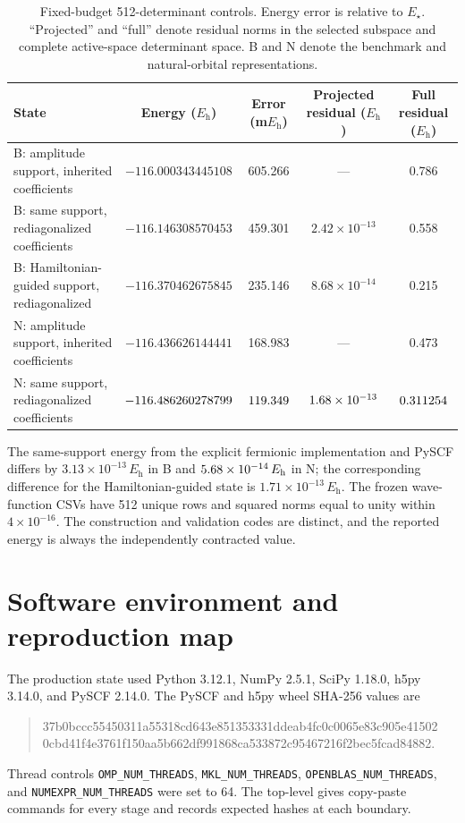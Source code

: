 \documentclass[aps,onecolumn,superscriptaddress,nofootinbib,longbibliography]{revtex4-2}
\newcommand{\Eh}{E_{\mathrm h}}
\begin{document}
\begin{table}[h]
\caption{Fixed-budget 512-determinant controls.  Energy error is relative to
\(E_\star\).  ``Projected'' and ``full'' denote residual norms in the selected
subspace and complete active-space determinant space.  B and N denote the
benchmark and natural-orbital representations.}
\label{tab:k512}
\small
\begin{tabular}{lcccc}
\toprule
State & Energy (\(\Eh\)) & Error (m\(\Eh\)) & Projected residual (\(\Eh\)) & Full residual (\(\Eh\)) \\
\midrule
B: amplitude support, inherited coefficients & \(-116.000343445108\) & 605.266 & --- & 0.786 \\
B: same support, rediagonalized coefficients & \(-116.146308570453\) & 459.301 & \(2.42\times10^{-13}\) & 0.558 \\
B: Hamiltonian-guided support, rediagonalized & \(-116.370462675845\) & 235.146 & \(8.68\times10^{-14}\) & 0.215 \\
N: amplitude support, inherited coefficients & \(-116.436626144441\) & 168.983 & --- & 0.473 \\
N: same support, rediagonalized coefficients & \(-116.486260278799\) & \(119.349\) & \(1.68\times10^{-13}\) & \(0.311254\) \\
\bottomrule
\end{tabular}
\end{table}

The same-support energy from the explicit fermionic implementation and PySCF
differs by \(3.13\times10^{-13}\,\Eh\) in B and
\(\NaturalKFiveTwelveIndependentDifference\,\Eh\) in N; the corresponding
difference for the Hamiltonian-guided state is
\(1.71\times10^{-13}\,\Eh\).  The frozen wave-function CSVs have 512 unique
rows and squared norms equal to unity within \(4\times10^{-16}\).  The
construction and validation codes are distinct, and the reported energy is
always the independently contracted value.

\section{Software environment and reproduction map}

The production state used Python 3.12.1, NumPy 2.5.1, SciPy 1.18.0, h5py
3.14.0, and PySCF 2.14.0.  The PySCF and h5py wheel SHA-256 values are
\begin{quote}\small\ttfamily
37b0bccc55450311a55318cd643e851353331ddeab4fc0c0065e83c905e41502\\
0cbd41f4e3761f150aa5b662df991868ca533872c95467216f2bec5fcad84882.
\end{quote}
Thread controls \texttt{OMP\_NUM\_THREADS}, \texttt{MKL\_NUM\_THREADS},
\texttt{OPENBLAS\_NUM\_THREADS}, and \texttt{NUMEXPR\_NUM\_THREADS} were set
to 64.  The top-level  gives copy-paste commands for every
stage and records expected hashes at each boundary.
\end{document}
